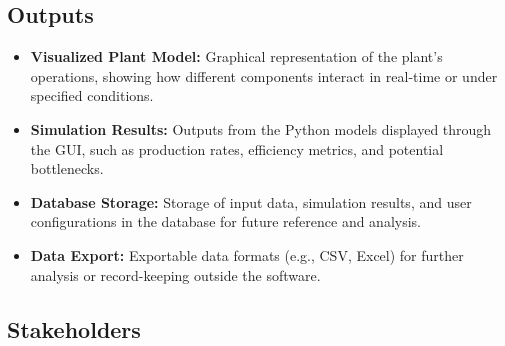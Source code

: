 \documentclass{article}
\begin{document}
\subsection*{Outputs}
\begin{itemize}
    \item \textbf{Visualized Plant Model:} Graphical representation of the plant's operations, showing how different components interact in real-time or under specified conditions.
    \item \textbf{Simulation Results:} Outputs from the Python models displayed through the GUI, such as production rates, efficiency metrics, and potential bottlenecks.
    \item \textbf{Database Storage:} Storage of input data, simulation results, and user configurations in the database for future reference and analysis.
    \item \textbf{Data Export:} Exportable data formats (e.g., CSV, Excel) for further analysis or record-keeping outside the software.

\end{itemize}


\subsection{Stakeholders}
\end{document}
